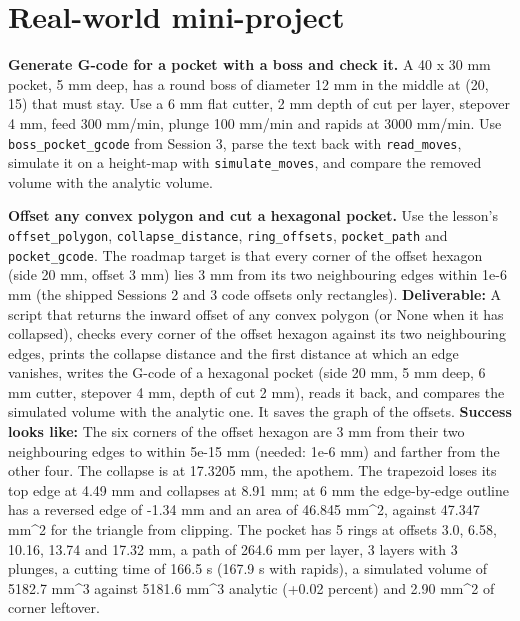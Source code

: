 \documentclass[11pt,a4paper]{article}
\begin{document}
\section{Real-world mini-project}
\textbf{Generate G-code for a pocket with a boss and check it.} A 40 x 30 mm pocket, 5 mm deep, has a round boss of diameter 12 mm in the middle at (20, 15) that must stay. Use a 6 mm flat cutter, 2 mm depth of cut per layer, stepover 4 mm, feed 300 mm/min, plunge 100 mm/min and rapids at 3000 mm/min. Use \texttt{boss\_pocket\_gcode} from Session 3, parse the text back with \texttt{read\_moves}, simulate it on a height-map with \texttt{simulate\_moves}, and compare the removed volume with the analytic volume.

\textbf{Offset any convex polygon and cut a hexagonal pocket.} Use the lesson's \texttt{offset\_polygon}, \texttt{collapse\_distance}, \texttt{ring\_offsets}, \texttt{pocket\_path} and \texttt{pocket\_gcode}. The roadmap target is that every corner of the offset hexagon (side 20 mm, offset 3 mm) lies 3 mm from its two neighbouring edges within 1e-6 mm (the shipped Sessions 2 and 3 code offsets only rectangles). \textbf{Deliverable:} A script that returns the inward offset of any convex polygon (or None when it has collapsed), checks every corner of the offset hexagon against its two neighbouring edges, prints the collapse distance and the first distance at which an edge vanishes, writes the G-code of a hexagonal pocket (side 20 mm, 5 mm deep, 6 mm cutter, stepover 4 mm, depth of cut 2 mm), reads it back, and compares the simulated volume with the analytic one. It saves the graph of the offsets. \textbf{Success looks like:} The six corners of the offset hexagon are 3 mm from their two neighbouring edges to within 5e-15 mm (needed: 1e-6 mm) and farther from the other four. The collapse is at 17.3205 mm, the apothem. The trapezoid loses its top edge at 4.49 mm and collapses at 8.91 mm; at 6 mm the edge-by-edge outline has a reversed edge of -1.34 mm and an area of 46.845 mm\textasciicircum{}2, against 47.347 mm\textasciicircum{}2 for the triangle from clipping. The pocket has 5 rings at offsets 3.0, 6.58, 10.16, 13.74 and 17.32 mm, a path of 264.6 mm per layer, 3 layers with 3 plunges, a cutting time of 166.5 s (167.9 s with rapids), a simulated volume of 5182.7 mm\textasciicircum{}3 against 5181.6 mm\textasciicircum{}3 analytic (+0.02 percent) and 2.90 mm\textasciicircum{}2 of corner leftover.
\end{document}
